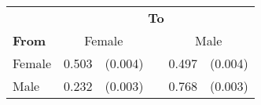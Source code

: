
\begin{tabular}{lr@{ }r@{}cr@{ }r}
    \toprule
    & \multicolumn{5}{c}{\textbf{To}} \\
    \cmidrule(l){2-6}
    \textbf{From} & \multicolumn{2}{c}{Female} && \multicolumn{2}{c}{Male} \\
    \midrule
    Female & 0.503 & (0.004) &  & 0.497 & (0.004) \\
    Male & 0.232 & (0.003) &  & 0.768 & (0.003) \\
    \bottomrule
\end{tabular}
